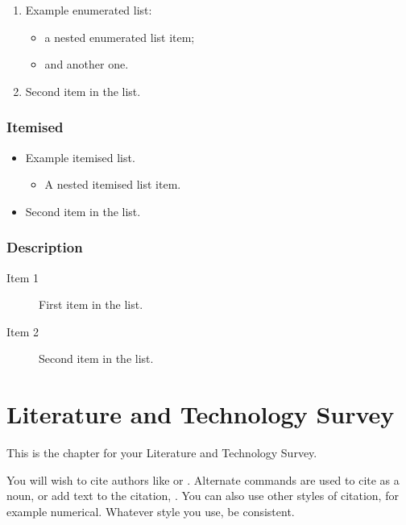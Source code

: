 \documentclass[12pt,a4paper]{report}
\begin{document}
\begin{enumerate}
\item Example enumerated list:
  \begin{itemize}
  \item a nested enumerated list item;
  \item and another one.
  \end{itemize}
\item Second item in the list.
\end{enumerate}

\subsection{Itemised}

\begin{itemize}
\item Example itemised list.
  \begin{itemize}
  \item A nested itemised list item.
  \end{itemize}
\item Second item in the list.
\end{itemize}

\subsection{Description}

\begin{description}
\item[Item 1]First item in the list.
\item[Item 2]Second item in the list.
\end{description}

\chapter{Literature and Technology Survey}

This is the chapter for your Literature and Technology Survey.

You will wish to cite authors like \citep{Brun:03:Atomic-C:oz} or \citep{Stra:17:Combinat:qf}. Alternate
commands are used to cite \citet{Brun:03:Atomic-C:oz} as a noun, or add text to the citation, \citep[\emph{e.g.},][]{Stra:17:Combinat:qf}. You can also use other styles of citation, for example numerical. Whatever style you use, be consistent.
\end{document}
